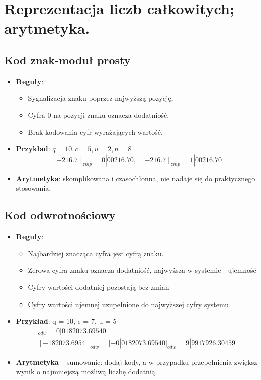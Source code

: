 \documentclass[main.tex]{subfiles}
\begin{document}
    \section{Reprezentacja liczb całkowitych; arytmetyka.}

    \subsection{Kod znak-moduł prosty}
    \begin{itemize}
        \item \textbf{Reguły}:
        \begin{itemize}[noitemsep]
            \item Sygnalizacja znaku poprzez najwyższą pozycję,
            \item Cyfra 0 na pozycji znaku oznacza dodatniość,
            \item Brak kodowania cyfr wyrażających wartość.
        \end{itemize}
        \item \textbf{Przykład}: $q = 10, c = 5, u = 2, n = 8$
        \[[+216.7]_{zmp} = 0|00216.70, ~~ [-216.7]_{zmp} = 1|00216.70\]
        \item \textbf{Arytmetyka}: skomplikowana i czasochłonna, nie nadaje się do praktycznego stosowania.
    \end{itemize}

    \subsection{Kod odwrotnościowy}
    \begin{itemize}
        \item \textbf{Reguły}:
        \begin{itemize}[noitemsep]
            \item Najbardziej znacząca cyfra jest cyfrą znaku.
            \item Zerowa cyfra znaku oznacza dodatniość, najwyższa w systemie - ujemność
            \item Cyfry wartości dodatniej pozostają bez zmian
            \item Cyfry wartości ujemnej uzupełnione do najwyższej cyfry systemu
        \end{itemize}

        \item \textbf{Przykład}: q = 10, c = 7, u = 5
        \begin{gather*}
        [182073.6954]
            _{odw} = 0|0182073.69540\\
            [-182073.6954]_{odw} = [-0|0182073.69540]_{odw} = 9|9917926.30459
        \end{gather*}

        \item \textbf{Arytmetyka} -- sumowanie: dodaj kody, a w przypadku przepełnienia zwiększ wynik o najmniejszą
        możliwą liczbę dodatnią.
    \end{itemize}
\end{document}
